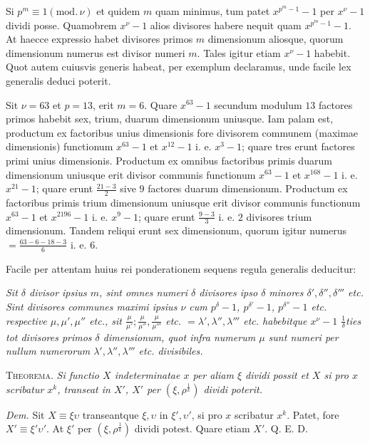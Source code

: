 Si $p^m\equiv1(\mathrm{mod.}\,\nu)$ et quidem $m$ quam minimus, tum patet $x^{p^m-1}-1$ per $x^\nu-1$ dividi posse. Quamobrem $x^\nu-1$ alios divisores habere nequit quam $x^{p^m-1}-1$. At haecce expressio habet divisores primos $m$ dimensionum aliosque, quorum dimensionum numerus est divisor numeri $m$. Tales igitur etiam $x^\nu-1$ habebit. Quot autem cuiusvis generis habeat, per exemplum declaramus, unde facile lex generalis deduci poterit.

Sit $\nu=63$ et $p=13$, erit $m=6$. Quare $x^{63}-1$ secundum modulum $13$ factores primos habebit sex, trium, duarum dimensionum uniusque. Iam palam est, productum ex factoribus unius dimensionis fore divisorem communem (maximae dimensionis) functionum $x^{63}-1$ et $x^{12}-1$ i. e. $x^3-1$; quare tres erunt factores primi unius dimensionis. Productum ex omnibus factoribus primis duarum dimensionum uniusque erit divisor communis functionum $x^{63}-1$ et $x^{168}-1$ i. e. $x^{21}-1$; quare erunt $\frac{21-3}2$ sive $9$ factores duarum dimensionum. Productum ex factoribus primis trium dimensionum uniusque erit divisor communis functionum $x^{63}-1$ et $x^{2196}-1$ i. e. $x^9-1$; quare erunt $\frac{9-3}3$ i. e. $2$ divisores trium dimensionum. Tandem reliqui erunt sex dimensionum, quorum igitur numerus $=\frac{63-6-18-3}6$ i. e. $6$.

Facile per attentam huius rei ponderationem sequens regula generalis deducitur:

\emph{Sit $\delta$ divisor ipsius $m$, sint omnes numeri $\delta$ divisores ipso $\delta$ minores $\delta',\delta'',\delta'''$ etc. Sint divisores communes maximi ipsius $\nu$ cum $p^\delta-1$, $p^{\delta'}-1$, $p^{\delta''}-1$ etc. respective $\mu,\mu',\mu''$ etc., sit $\frac\mu{\mu'};\frac\mu{\mu''},\frac\mu{\mu'''}$ etc. $=\lambda',\lambda'',\lambda'''$ etc. habebitque $x^\nu-1$ $\frac1\delta$ties tot divisores primos $\delta$ dimensionum, quot infra numerum $\mu$ sunt numeri per nullum numerorum $\lambda',\lambda'',\lambda'''$ etc. divisibiles.}

\textsc{Theorema.} \emph{Si functio $X$ indeterminatae $x$ per aliam $\xi$ dividi possit et $X$ si pro $x$ scribatur $x^k$, transeat in $X'$, $X'$ per $(\xi,\rho^{\frac1k})$ dividi poterit.}

\emph{Dem.} Sit $X\equiv\xi\upsilon$ transeantque $\xi,\upsilon$ in $\xi',\upsilon'$, si pro $x$ scribatur $x^k$. Patet, fore $X'\equiv\xi'\upsilon'$. At $\xi'$ per $(\xi,\rho^{\frac1k})$ dividi potest. Quare etiam $X'$. Q. E. D.
